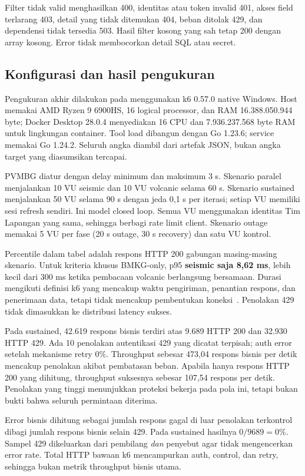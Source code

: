 Filter tidak valid menghasilkan 400, identitas atau token invalid 401, akses field terlarang 403, detail yang tidak ditemukan 404, beban ditolak 429, dan dependensi tidak tersedia 503. Hasil filter kosong yang sah tetap 200 dengan array kosong. Error tidak membocorkan detail SQL atau secret.

\subsection{Konfigurasi dan hasil pengukuran}
Pengukuran akhir dilakukan pada \EvidenceDate menggunakan k6 0.57.0 native Windows. Host memakai AMD Ryzen 9 6900HS, 16 logical processor, dan RAM 16.388.050.944 byte; Docker Desktop 28.0.4 menyediakan 16 CPU dan 7.936.237.568 byte RAM untuk lingkungan container. Tool load dibangun dengan Go 1.23.6; service memakai Go 1.24.2. Seluruh angka diambil dari artefak JSON, bukan angka target yang diasumsikan tercapai.

PVMBG diatur dengan delay minimum dan maksimum 3 s. Skenario paralel menjalankan 10 VU seismic dan 10 VU volcanic selama 60 s. Skenario sustained menjalankan 50 VU selama 90 s dengan jeda 0,1 s per iterasi; setiap VU memiliki sesi refresh sendiri. Ini model closed loop. Semua VU menggunakan identitas Tim Lapangan yang sama, sehingga berbagi rate limit client. Skenario outage memakai 5 VU per fase (20 s outage, 30 s recovery) dan satu VU kontrol.



Percentile dalam tabel adalah respons HTTP 200 gabungan masing-masing skenario. Untuk kriteria khusus BMKG-only, p95 \textbf{seismic saja 8,62 ms}, lebih kecil dari 300 ms ketika pembacaan volcanic berlangsung bersamaan. Durasi mengikuti definisi k6 yang mencakup waktu pengiriman, penantian respons, dan penerimaan data, tetapi tidak mencakup pembentukan koneksi~\cite{k6-metrics}. Penolakan 429 tidak dimasukkan ke distribusi latency sukses.

Pada sustained, 42.619 respons bisnis terdiri atas 9.689 HTTP 200 dan 32.930 HTTP 429. Ada 10 penolakan autentikasi 429 yang dicatat terpisah; auth error setelah mekanisme retry 0\%. Throughput sebesar 473,04 respons bisnis per detik mencakup penolakan akibat pembatasan beban. Apabila hanya respons HTTP 200 yang dihitung, throughput suksesnya sebesar 107,54 respons per detik. Penolakan yang tinggi menunjukkan proteksi bekerja pada pola ini, tetapi bukan bukti bahwa seluruh permintaan diterima.

Error bisnis dihitung sebagai jumlah respons gagal di luar penolakan terkontrol dibagi jumlah respons bisnis selain 429. Pada sustained hasilnya $0/9689=0\%$. Sampel 429 dikeluarkan dari pembilang \emph{dan} penyebut agar tidak mengencerkan error rate. Total HTTP bawaan k6 mencampurkan auth, control, dan retry, sehingga bukan metrik throughput bisnis utama.

